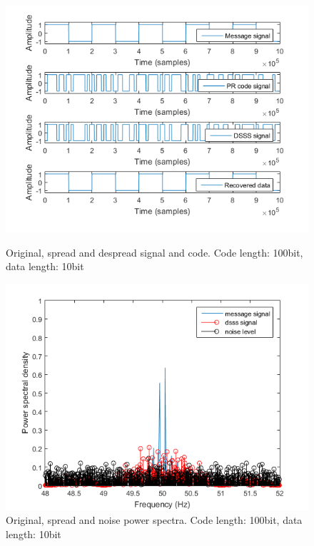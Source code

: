 \documentclass[12pt,a4paper]{article}
\begin{document}
	\begin{figure}
		\includegraphics[width=\textwidth]{images/code_cl100_dl10.png}
		\caption{Original, spread and despread signal and code. Code length: 100bit, data length: 10bit}
		\label{100:10}
		
		\includegraphics[width=\textwidth]{images/ft_cl_100_dl10.png}
		\caption{Original, spread and noise power spectra. Code length: 100bit, data length: 10bit}
		\label{ft:100:10}
	\end{figure}
\end{document}
